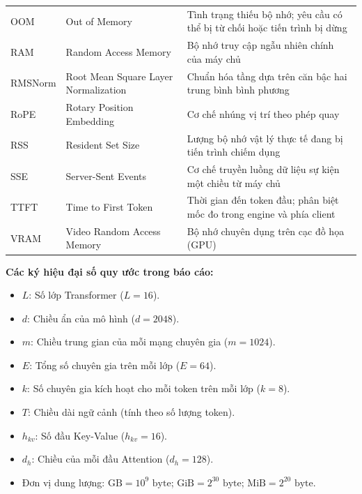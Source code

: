 \begin{longtable}{@{}>{\RaggedRight\arraybackslash}p{2.2cm} >{\RaggedRight\arraybackslash}p{4.4cm} >{\RaggedRight\arraybackslash}p{8.5cm}@{}}
OOM & Out of Memory & Tình trạng thiếu bộ nhớ; yêu cầu có thể bị từ chối hoặc tiến trình bị dừng \\
RAM & Random Access Memory & Bộ nhớ truy cập ngẫu nhiên chính của máy chủ \\
RMSNorm & Root Mean Square Layer Normalization & Chuẩn hóa tầng dựa trên căn bậc hai trung bình bình phương \\
RoPE & Rotary Position Embedding & Cơ chế nhúng vị trí theo phép quay \\
RSS & Resident Set Size & Lượng bộ nhớ vật lý thực tế đang bị tiến trình chiếm dụng \\
SSE & Server-Sent Events & Cơ chế truyền luồng dữ liệu sự kiện một chiều từ máy chủ \\
TTFT & Time to First Token & Thời gian đến token đầu; phân biệt mốc đo trong engine và phía client \\
VRAM & Video Random Access Memory & Bộ nhớ chuyên dụng trên cạc đồ họa (GPU) \\
\end{longtable}

\vspace{0.5cm}
\noindent\textbf{Các ký hiệu đại số quy ước trong báo cáo:}
\begin{itemize}
    \item $L$: Số lớp Transformer ($L = 16$).
    \item $d$: Chiều ẩn của mô hình ($d = 2048$).
    \item $m$: Chiều trung gian của mỗi mạng chuyên gia ($m = 1024$).
    \item $E$: Tổng số chuyên gia trên mỗi lớp ($E = 64$).
    \item $k$: Số chuyên gia kích hoạt cho mỗi token trên mỗi lớp ($k = 8$).
    \item $T$: Chiều dài ngữ cảnh (tính theo số lượng token).
    \item $h_{kv}$: Số đầu Key-Value ($h_{kv} = 16$).
    \item $d_h$: Chiều của mỗi đầu Attention ($d_h = 128$).
    \item Đơn vị dung lượng: $\text{GB} = 10^9\text{ byte}$; $\text{GiB} = 2^{30}\text{ byte}$; $\text{MiB} = 2^{20}\text{ byte}$.
\end{itemize}

